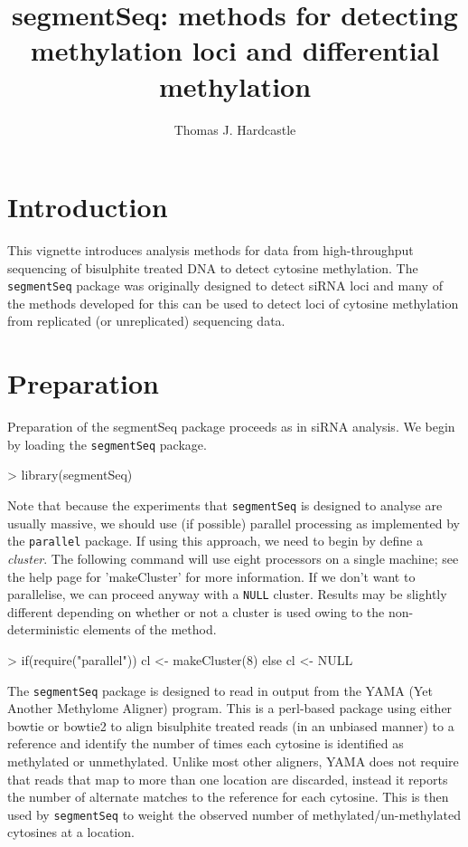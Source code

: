 \documentclass[a4paper]{article}
\title{segmentSeq: methods for detecting methylation loci and differential methylation}
\author{Thomas J. Hardcastle}
\begin{document}
\maketitle

\section{Introduction}

This vignette introduces analysis methods for data from high-throughput sequencing of bisulphite treated DNA to detect cytosine methylation. The \verb'segmentSeq' package was originally designed to detect siRNA loci \cite{Hardcastle:2011} and many of the methods developed for this can be used to detect loci of cytosine methylation from replicated (or unreplicated) sequencing data.

\section{Preparation}

Preparation of the segmentSeq package proceeds as in siRNA analysis. We begin by loading the \verb'segmentSeq' package.

\begin{Schunk}
\begin{Sinput}
>   library(segmentSeq)
\end{Sinput}
\end{Schunk}

Note that because the experiments that \verb'segmentSeq' is designed to analyse are usually massive, we should use (if possible) parallel processing as implemented by the \verb'parallel' package. If using this approach, we need to begin by define a \textsl{cluster}. The following command will use eight processors on a single machine; see the help page for 'makeCluster' for more information. If we don't want to parallelise, we can proceed anyway with a \verb'NULL' cluster. Results may be slightly different depending on whether or not a cluster is used owing to the non-deterministic elements of the method.

\begin{Schunk}
\begin{Sinput}
> if(require("parallel")) cl <- makeCluster(8) else cl <- NULL
\end{Sinput}
\end{Schunk}

The \verb'segmentSeq' package is designed to read in output from the YAMA (Yet Another Methylome Aligner) program. This is a perl-based package using either bowtie or bowtie2 to align bisulphite treated reads (in an unbiased manner) to a reference and identify the number of times each cytosine is identified as methylated or unmethylated. Unlike most other aligners, YAMA does not require that reads that map to more than one location are discarded, instead it reports the number of alternate matches to the reference for each cytosine. This is then used by \verb'segmentSeq' to weight the observed number of methylated/un-methylated cytosines at a location.
\end{document}
